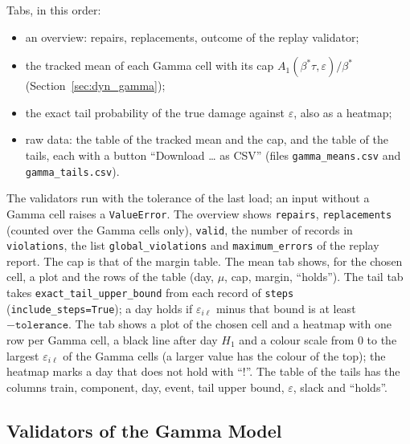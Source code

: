Tabs, in this order:
\begin{itemize}[nosep]
  \item an overview: repairs, replacements, outcome of the replay validator;
  \item the tracked mean of each Gamma cell with its cap $A_1(\beta^*\tau,\varepsilon)/\beta^*$ (Section~\ref{sec:dyn_gamma});
  \item the exact tail probability of the true damage against $\varepsilon$, also as a heatmap;
  \item raw data: the table of the tracked mean and the cap, and the table of the tails, each with a button ``Download \ldots{} as CSV'' (files \texttt{gamma\_means.csv} and \texttt{gamma\_tails.csv}).
\end{itemize}
The validators run with the tolerance of the last load; an input without a Gamma cell raises a \texttt{ValueError}. The overview shows \texttt{repairs}, \texttt{replacements} (counted over the Gamma cells only), \texttt{valid}, the number of records in \texttt{violations}, the list \texttt{global\_violations} and \texttt{maximum\_errors} of the replay report. The cap is that of the margin table. The mean tab shows, for the chosen cell, a plot and the rows of the table (day, $\mu$, cap, margin, ``holds''). The tail tab takes \texttt{exact\_tail\_upper\_bound} from each record of \texttt{steps} (\texttt{include\_steps=True}); a day holds if $\varepsilon_{i\ell}$ minus that bound is at least $-\texttt{tolerance}$. The tab shows a plot of the chosen cell and a heatmap with one row per Gamma cell, a black line after day $H_1$ and a colour scale from $0$ to the largest $\varepsilon_{i\ell}$ of the Gamma cells (a larger value has the colour of the top); the heatmap marks a day that does not hold with ``!''. The table of the tails has the columns train, component, day, event, tail upper bound, $\varepsilon$, slack and ``holds''.

\subsection{Validators of the Gamma Model}
\label{sec:validation_gamma}

